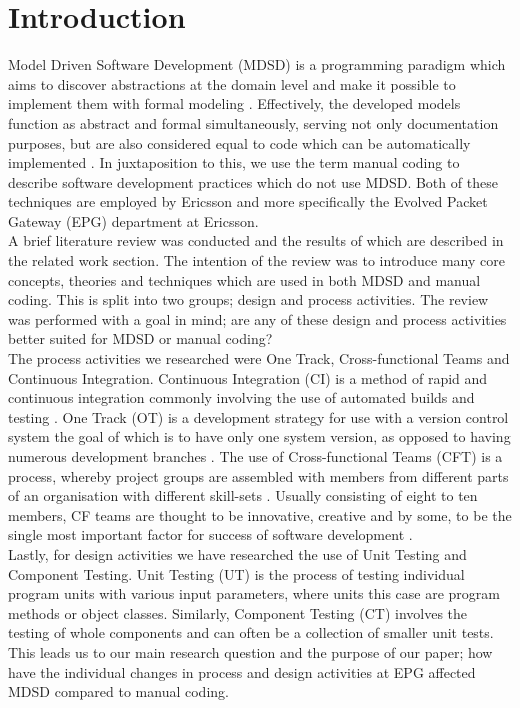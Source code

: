 \documentclass[fina_report_innit.tex]{subfiles}
\begin{document}
\section{Introduction}

Model Driven Software Development (MDSD) is a programming paradigm which aims to discover abstractions at the domain level and make it possible to implement them with formal modeling \cite{stahl2006model}. Effectively, the developed models function as abstract and formal simultaneously, serving not only documentation purposes, but are also considered equal to code which can be automatically implemented \cite{stahl2006model}. In juxtaposition to this, we use the term manual coding to describe software development practices which do not use MDSD. Both of these techniques are employed by Ericsson and more specifically the Evolved Packet Gateway (EPG) department at Ericsson.
\\

A brief literature review was conducted and the results of which are described in the related work section. The intention of the review was to introduce many core concepts, theories and techniques which are used in both MDSD and manual coding. This is split into two groups; design and process activities. The review was performed with a goal in mind; are any of these design and process activities better suited for MDSD or manual coding?
\\

The process activities we researched were One Track, Cross-functional Teams and Continuous Integration. Continuous Integration (CI) is a method of rapid and continuous integration commonly involving the use of automated builds and testing \cite{sommerville10software}. One Track (OT) is a development strategy for use with a version control system the goal of which is to have only one system version, as opposed to having numerous development branches \cite{hribar2008first}. The use of Cross-functional Teams (CFT) is a process, whereby project groups are assembled with members from different parts of an organisation with different skill-sets \cite{henke1993perspective}\cite{ghobadi2011challenges}. Usually consisting of eight to ten members, CF teams are thought to be innovative, creative \cite{ghobadi2011challenges} and by some, to be the single most important factor for success of software development \cite{marchwinski2000technical}.
\\

Lastly, for design activities we have researched the use of Unit Testing and Component Testing. Unit Testing (UT) is the process of testing individual program units with various input parameters, where units this case are program methods or object classes. Similarly, Component Testing (CT) involves the testing of whole components and can often be a collection of smaller unit tests. This leads us to our main research question and the purpose of our paper; how have the individual changes in process and design activities at EPG affected MDSD compared to manual coding.
\\
\end{document}
